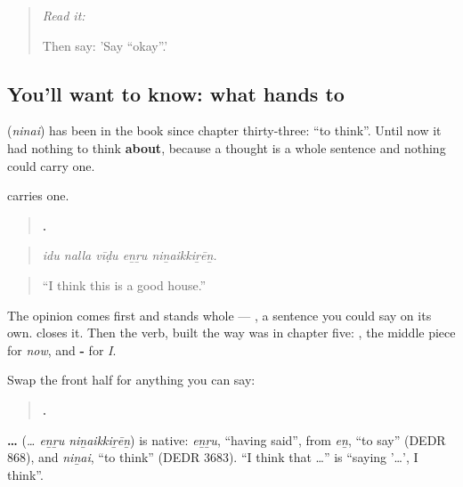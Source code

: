 \label{lesson:TA-C77-opinion}



\begin{quote}
\emph{Read it:} \textbf{}

Then say: 'Say \textquotedblleft{}okay\textquotedblright{}.'
\end{quote}

\subsection*{You'll want to know: what  hands to }
\textbf{} (\emph{ninai}) has been in the book since chapter thirty-three: \textquotedblleft{}to think\textquotedblright{}. Until now it had nothing to think \textbf{about}, because a thought is a whole sentence and nothing could carry one.

 carries one.

\begin{quote}
\textbf{    .}
\end{quote}

\begin{quote}
\emph{idu nalla vīḍu eṉṟu niṉaikkiṟēṉ.}
\end{quote}

\begin{quote}
\textquotedblleft{}I think this is a good house.\textquotedblright{}
\end{quote}

The opinion comes first and stands whole — \textbf{  }, a sentence you could say on its own.  closes it. Then the verb, built the way  was in chapter five: , the middle piece for \emph{now}, and \textbf{-} for \emph{I}.

Swap the front half for anything you can say:

\begin{quote}
\textbf{    .}
\end{quote}

\begin{cousinweb}
\textbf{…  } (\emph{… eṉṟu niṉaikkiṟēṉ}) is native: \emph{eṉṟu}, \textquotedblleft{}having said\textquotedblright{}, from \emph{eṉ}, \textquotedblleft{}to say\textquotedblright{} (DEDR 868), and \emph{niṉai}, \textquotedblleft{}to think\textquotedblright{} (DEDR 3683). \textquotedblleft{}I think that …\textquotedblright{} is \textquotedblleft{}saying '…', I think\textquotedblright{}.
\end{cousinweb}

